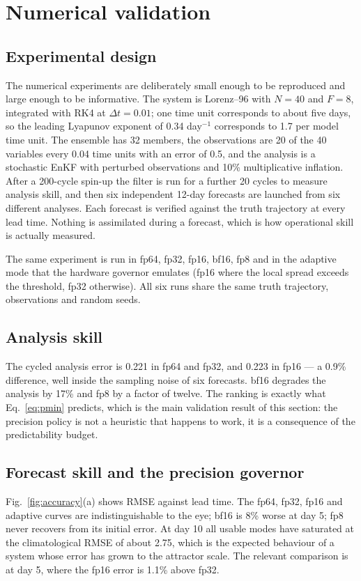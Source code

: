 \FloatBarrier
\section{Numerical validation}\label{sec:validation}

\subsection{Experimental design}
The numerical experiments are deliberately small enough to be reproduced and large enough to be
informative. The system is Lorenz--96 with $N=40$ and $F=8$, integrated with RK4 at
$\Delta t=0.01$; one time unit corresponds to about five days, so the leading Lyapunov exponent of
0.34 day$^{-1}$ corresponds to 1.7 per model time unit. The ensemble has 32 members, the
observations are 20 of the 40 variables every 0.04 time units with an error of 0.5, and the
analysis is a stochastic EnKF with perturbed observations and 10\% multiplicative inflation.
After a 200-cycle spin-up the filter is run for a further 20 cycles to measure analysis skill, and
then six independent 12-day forecasts are launched from six different analyses. Each forecast is
verified against the truth trajectory at every lead time. Nothing is assimilated during a
forecast, which is how operational skill is actually measured.

The same experiment is run in fp64, fp32, fp16, bf16, fp8 and in the adaptive mode that the
hardware governor emulates (fp16 where the local spread exceeds the threshold, fp32 otherwise).
All six runs share the same truth trajectory, observations and random seeds.

\subsection{Analysis skill}
The cycled analysis error is 0.221 in fp64 and fp32, and 0.223 in fp16 --- a 0.9\% difference,
well inside the sampling noise of six forecasts. bf16 degrades the analysis by 17\% and fp8 by a
factor of twelve. The ranking is exactly what Eq.~\eqref{eq:pmin} predicts, which is the main
validation result of this section: the precision policy is not a heuristic that happens to work,
it is a consequence of the predictability budget.

\subsection{Forecast skill and the precision governor}
Fig.~\ref{fig:accuracy}(a) shows RMSE against lead time. The fp64, fp32, fp16 and adaptive curves
are indistinguishable to the eye; bf16 is 8\% worse at day 5; fp8 never recovers from its initial
error. At day 10 all usable modes have saturated at the climatological RMSE of about 2.75, which is
the expected behaviour of a system whose error has grown to the attractor scale. The relevant
comparison is at day 5, where the fp16 error is 1.1\% above fp32.

